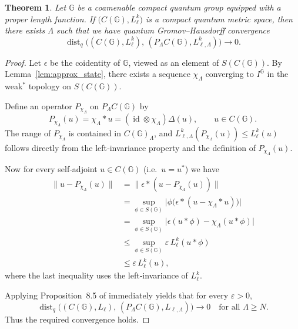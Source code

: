 \documentclass[12pt, reqno]{amsart}
\newtheorem{theorem}{Theorem}[section]
\theoremstyle{definition}
\theoremstyle{remark}
\numberwithin{equation}{section}
\begin{document}
\begin{theorem}\label{theorem GH}
Let \(\mathbb{G}\) be a coamenable compact quantum group equipped with a proper length 
function. If \(\bigl(C(\mathbb{G}), L_\ell^k\bigr)\) is a compact quantum 
metric space, then there exists \(\Lambda\) such that we have quantum 
Gromov--Hausdorff convergence
\[
\operatorname{dist}_q\bigl((C(\mathbb{G}),L^k_{\ell}),\, 
(P_\Lambda C(\mathbb{G}), L^k_{\ell,\Lambda})\bigr) \to 0.
\]
\end{theorem}

\begin{proof}
Let \(\epsilon\) be the coidentity of \(\mathbb{G}\), viewed as an element 
of \(S(C(\mathbb{G}))\). By Lemma~\ref{lem:approx_state}, there exists a 
sequence \(\chi_\Lambda\) converging to \(I^{\mathbb{G}}\) in the weak\(^*\) 
topology on \(S(C(\mathbb{G}))\).

Define an operator \(P_{\chi_\Lambda}\) on \(P_\Lambda C(\mathbb{G})\) by
\[
P_{\chi_\Lambda}(u) = \chi_\Lambda * u = (\operatorname{id} \otimes \chi_\Lambda)\Delta(u), 
\qquad u\in C(\mathbb{G}).
\]
The range of \(P_{\chi_\Lambda}\) is contained in \(C(\mathbb{G})_\Lambda\), 
and \(L_{\ell,\Lambda}^k(P_{\chi_\Lambda}(u)) \le L_\ell^k(u)\) follows directly 
from the left‑invariance property and the definition of \(P_{\chi_\Lambda}(u)\).

Now for every self‑adjoint \(u\in C(\mathbb{G})\) (i.e.\ \(u=u^*\)) we have
\[
\begin{aligned}
\|u - P_{\chi_\Lambda}(u)\|
   &= \|\epsilon * (u - P_{\chi_\Lambda}(u))\| \\
   &= \sup_{\phi \in S(\mathbb{G})} \bigl|\phi\bigl(\epsilon *(u - \chi_\Lambda * u)\bigr)\bigr| \\
   &= \sup_{\phi \in S(\mathbb{G})} \bigl|\epsilon(u * \phi) - \chi_\Lambda(u * \phi)\bigr| \\
   &\le \sup_{\phi \in S(\mathbb{G})} \varepsilon\, L_\ell^k(u * \phi) \\
   &\le \varepsilon\, L_\ell^k(u),
\end{aligned}
\]
where the last inequality uses the left‑invariance of \(L_\ell^k\).

Applying Proposition~8.5 of \cite{9} immediately yields that for every 
\(\varepsilon>0\),
\[
\operatorname{dist}_q\bigl((C(\mathbb{G}),L_{\ell}),\, 
(P_\Lambda C(\mathbb{G}), L_{\ell,\Lambda})\bigr) \to 0
\quad\text{for all } \Lambda \ge N.
\]
Thus the required convergence holds.
\end{proof}
\end{document}
